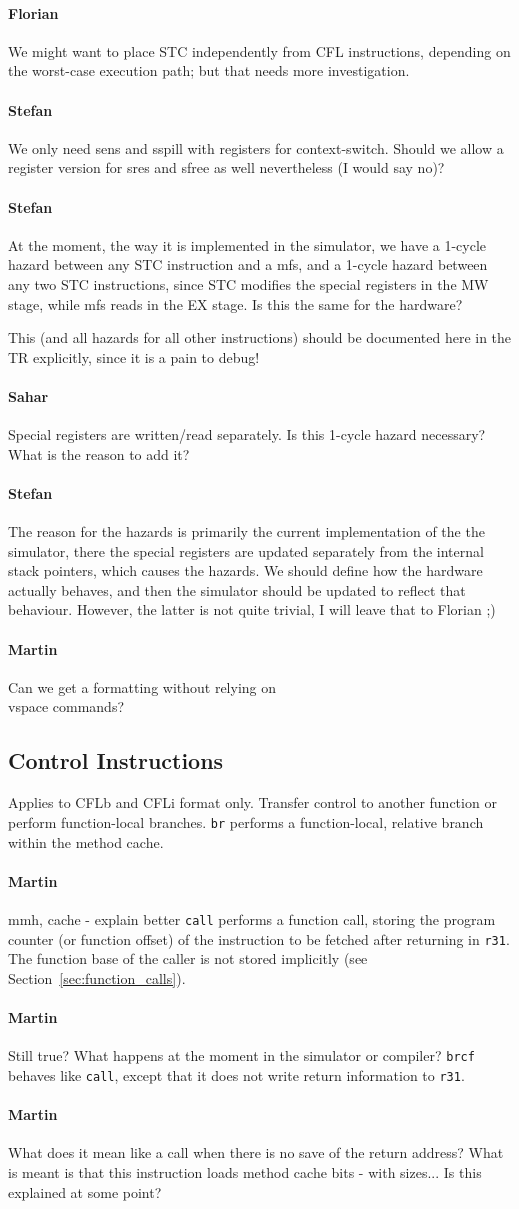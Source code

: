 \documentclass{IEEEtran}
\newcommand{\comment}[3]{\paragraph*{\textbf{#1}}{\color{#3}#2}}
\newcommand{\martin}[1]{\comment{Martin}{#1}{Blue}}
\newcommand{\stefan}[1]{\comment{Stefan}{#1}{RoyalPurple}}
\newcommand{\fb}[1]{\comment{Florian}{#1}{Emerald}}
\newcommand{\sahar}[1]{\comment{Sahar}{#1}{Green}}
\begin{document}
\fb{We might want to place STC independently from CFL instructions, depending on
the worst-case execution path; but that needs more investigation.}

\stefan{We only need sens and sspill with registers for context-switch. Should we allow a 
register version for sres and sfree as well nevertheless (I would say no)?}

\stefan{At the moment, the way it is implemented in the simulator, we have a 1-cycle hazard between 
any STC instruction and a mfs, and a 1-cycle hazard between any two STC instructions, since STC 
modifies the special registers in the MW stage, while mfs reads in the EX stage. 
Is this the same for the hardware? 

This (and all hazards for all other instructions) should be documented here in the TR explicitly, since it is a pain to debug!}

\sahar{Special registers are written/read separately. Is this 1-cycle hazard necessary? What is the reason to add it?}

\stefan{The reason for the hazards is primarily the current implementation of the the simulator, there the special registers 
are updated separately from the internal stack pointers, which causes the hazards. We should define how the 
hardware actually behaves, and then the simulator should be updated to reflect that behaviour. However, the latter is not quite trivial, I will
leave that to Florian ;) }

\vspace{5mm}
\martin{Can we get a formatting without relying on \\vspace commands?}

\subsection{Control Instructions}

Applies to CFLb and CFLi format only.
Transfer control to another function or perform function-local branches.
\texttt{br} performs a function-local, relative branch within the method cache.
\martin{mmh, cache - explain better}
\texttt{call} performs a function call, storing the program counter (or function offset) of
the instruction to be fetched after returning in \texttt{r31}.
The function base of the caller is not stored implicitly (see Section~\ref{sec:function_calls}).
\martin{Still true? What happens at the moment in the simulator or compiler?}
\texttt{brcf} behaves like \texttt{call}, except that it does not write return information
to \texttt{r31}.
\martin{What does it mean like a call when there is no save of the return address?
What is meant is that this instruction loads method cache bits - with sizes... Is this
explained at some point?}
\end{document}
